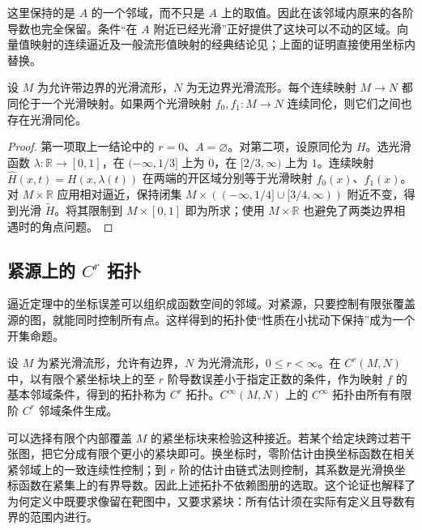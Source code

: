 这里保持的是 \(A\) 的一个邻域，而不只是 \(A\) 上的取值。因此在该邻域内原来的各阶导数也完全保留。条件“在 \(A\) 附近已经光滑”正好提供了这块可以不动的区域。向量值映射的连续逼近及一般流形值映射的经典结论见\cite[定理6.21、6.26，第136--141页]{Lee2012Smooth}；上面的证明直接使用坐标内替换。

\begin{corollary}
	\label{g2:cor:continuous-smooth-homotopy}
	设 \(M\) 为允许带边界的光滑流形，\(N\) 为无边界光滑流形。每个连续映射 \(M\to N\) 都同伦于一个光滑映射。如果两个光滑映射 \(f_0,f_1:M\to N\) 连续同伦，则它们之间也存在光滑同伦。
\end{corollary}
\begin{proof}
	第一项取上一结论中的 \(r=0\)、\(A=\varnothing\)。对第二项，设原同伦为 \(H\)。选光滑函数 \(\lambda:\mathbb R\to[0,1]\)，在 \(( -\infty,1/3]\) 上为 \(0\)，在 \([2/3,\infty)\) 上为 \(1\)。连续映射 \(\widehat H(x,t)=H(x,\lambda(t))\) 在两端的开区域分别等于光滑映射 \(f_0(x)\)、\(f_1(x)\)。对 \(M\times\mathbb R\) 应用相对逼近，保持闭集 \(M\times(( -\infty,1/4]\cup[3/4,\infty))\) 附近不变，得到光滑 \(\widetilde H\)。将其限制到 \(M\times[0,1]\) 即为所求；使用 \(M\times\mathbb R\) 也避免了两类边界相遇时的角点问题。
\end{proof}

\subsection{\texorpdfstring{紧源上的 \(C^r\) 拓扑}{紧源上的 Cʳ 拓扑}}
\label{g2:subsec:1401:03}

逼近定理中的坐标误差可以组织成函数空间的邻域。对紧源，只要控制有限张覆盖源的图，就能同时控制所有点。这样得到的拓扑使“性质在小扰动下保持”成为一个开集命题。

\begin{definition}
	\label{g2:def:compact-cr-topology}
	设 \(M\) 为紧光滑流形，允许有边界，\(N\) 为光滑流形，\(0\le r<\infty\)。在 \(C^r(M,N)\) 中，以有限个紧坐标块上的至 \(r\) 阶导数误差小于指定正数的条件，作为映射 \(f\) 的基本邻域条件，得到的拓扑称为 \(C^r\) 拓扑。\(C^\infty(M,N)\) 上的 \(C^\infty\) 拓扑由所有有限阶 \(C^r\) 邻域条件生成。
\end{definition}

可以选择有限个内部覆盖 \(M\) 的紧坐标块来检验这种接近。若某个给定块跨过若干张图，把它分成有限个更小的紧块即可。换坐标时，零阶估计由换坐标函数在相关紧邻域上的一致连续性控制；到 \(r\) 阶的估计由链式法则控制，其系数是光滑换坐标函数在紧集上的有界导数。因此上述拓扑不依赖图册的选取。这个论证也解释了为何定义中既要求像留在靶图中，又要求紧块：所有估计须在实际有定义且导数有界的范围内进行。


